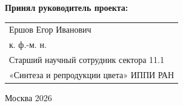 \begin{titlepage}
\vspace{1em}
{\bf Принял руководитель проекта: \vspace{2mm}}

{
\begin{tabular}{l}
Ершов Егор Иванович\\
к. ф.-м. н.\\
Старший научный сотрудник сектора 11.1  \\ «Синтеза и репродукции цвета» ИППИ РАН
\end{tabular}}





\vspace{\fill}

\begin{center}
Москва 2026
\end{center}

\end{titlepage}